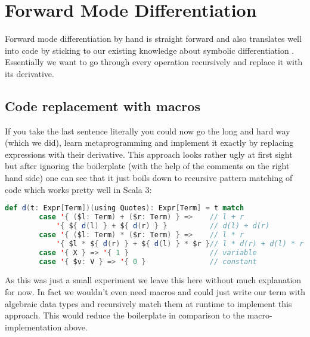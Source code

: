 \section{Forward Mode Differentiation}

Forward mode differentiation by hand is straight forward and also translates well into code by sticking to our existing knowledge about symbolic differentiation . Essentially we want to go through every operation recursively and replace it with its derivative.


\subsection{Code replacement with macros}
If you take the last sentence literally you could now go the long and hard way (which we did), learn metaprogramming and implement it exactly by replacing expressions with their derivative. This approach looks rather ugly at first sight but after ignoring the boilerplate (with the help of the comments on the right hand side) one can see that it just boils down to recursive pattern matching of code which works pretty well in Scala 3:
\begin{lstlisting}[language=scala]
    def d(t: Expr[Term])(using Quotes): Expr[Term] = t match
        case '{ ($l: Term) + ($r: Term) } =>    // l + r
            '{ ${ d(l) } + ${ d(r) } }          // d(l) + d(r)
        case '{ ($l: Term) * ($r: Term) } =>    // l * r
            '{ $l * ${ d(r) } + ${ d(l) } * $r }// l * d(r) + d(l) * r
        case '{ X } => '{ 1 }                   // variable
        case '{ $v: V } => '{ 0 }               // constant
\end{lstlisting}
As this was just a small experiment we leave this here without much explanation for now.  In fact we wouldn't even need macros and could just write our term with algebraic data types and recursively match them at runtime to implement this approach. This would reduce the boilerplate in comparison to the macro-implementation above.


